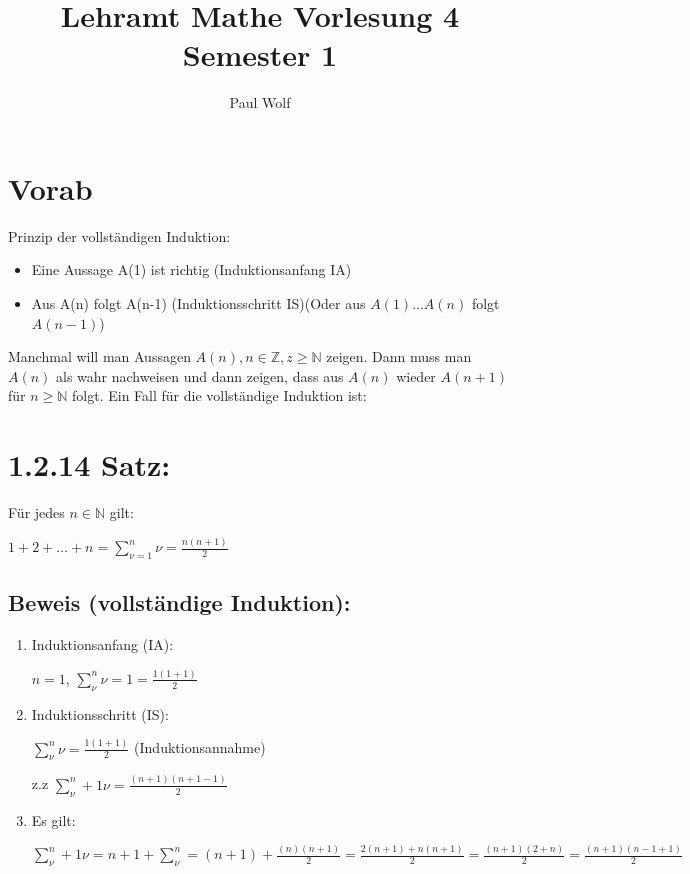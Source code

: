 \documentclass[11pt]{scrartcl}
\title{Lehramt Mathe Vorlesung 4 Semester 1}
\author{Paul Wolf}
\begin{document}
\maketitle
\tableofcontents

\section{Vorab}
\label{sec:vorab-1.2.14}

Prinzip der vollständigen Induktion:
\begin{itemize}
\item Eine Aussage A(1) ist richtig (Induktionsanfang IA)
\item Aus A(n) folgt A(n-1) (Induktionsschritt IS)(Oder aus $A(1)\dots A(n)$ folgt $A(n-1)$)
\end{itemize}
Manchmal will man Aussagen $ A(n), n \in \mathbb{Z} , z \geq \mathbb{N} $ zeigen. Dann muss man $A(n)$ als wahr nachweisen und dann zeigen, dass aus $A(n)$ wieder $A(n+1) $ für $n \geq \mathbb{N}$ folgt. Ein Fall für die vollständige Induktion ist:


\section{1.2.14 Satz:}
\label{sec:satz-1.2.14}

Für jedes $n \in \mathbb{N}$ gilt:

$1+2+\dots+n = \sum \limits_{\nu=1}^n \nu = \frac{n(n+1)}{2} $

\subsection*{Beweis (vollständige Induktion):}

\begin{enumerate}
\item Induktionsanfang (IA):

$n=1$,
$\sum \limits_{ \nu}^n \nu = 1 = \frac{1(1+1)}{2}$

\item Induktionsschritt (IS):

$\sum \limits_{ \nu}^n \nu = \frac{1(1+1)}{2}$ (Induktionsannahme)

z.z $\sum \limits_{ \nu}^n+1 \nu = \frac{(n+1)(n+1-1)}{2}$

\item Es gilt:

$\sum \limits_{ \nu}^n+1 \nu = n+1+\sum \limits_{ \nu}^n = (n+1) + \frac{(n)(n+1)}{2} = \frac{2(n+1)+n(n+1)}{2} = \frac{(n+1)(2+n)}{2}= \frac{(n+1)(n-1+1)}{2} $


\end{enumerate}
\end{document}
